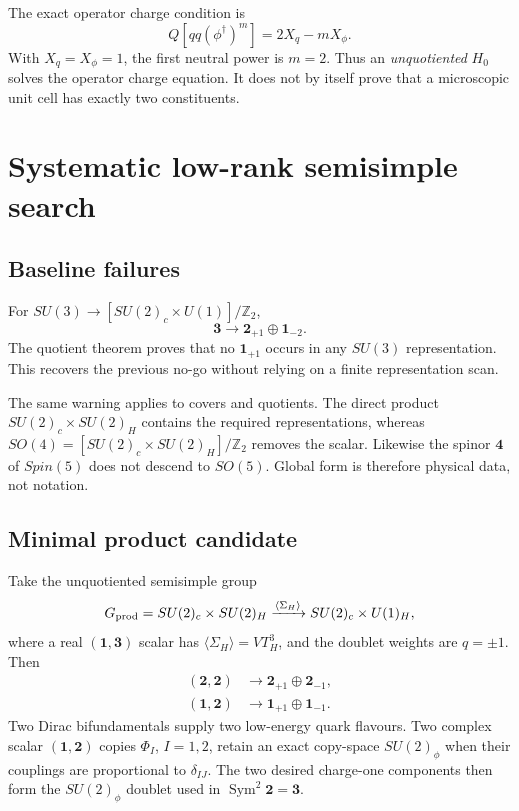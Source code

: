 \documentclass[11pt]{article}
\theoremstyle{definition}
\theoremstyle{remark}
\newcommand{\ZZ}{\mathbb Z}
\begin{document}
The exact operator charge condition is
\begin{equation}
 Q\!\left[qq(\phi^\dagger)^m\right]
 =2X_q-mX_\phi.
 \label{eq:dressing-charge}
\end{equation}
With \(X_q=X_\phi=1\), the first neutral power is \(m=2\).  Thus an
\emph{unquotiented} \(H_0\) solves the operator charge equation.  It does not
by itself prove that a microscopic unit cell has exactly two constituents.

\section{Systematic low-rank semisimple search}

\subsection{Baseline failures}

For
\(SU(3)\to[SU(2)_c\times U(1)]/\ZZ_2\),
\begin{equation}
 \bm3\to\bm2_{+1}\oplus\bm1_{-2}.
 \label{eq:su3-branch}
\end{equation}
The quotient theorem proves that no \(\bm1_{+1}\) occurs in any
\(SU(3)\) representation.  This recovers the previous no-go without relying
on a finite representation scan.

The same warning applies to covers and quotients.  The direct product
\(SU(2)_c\times SU(2)_H\) contains the required representations, whereas
\(SO(4)=[SU(2)_c\times SU(2)_H]/\ZZ_2\) removes the scalar.  Likewise the
spinor \(\bm4\) of \(Spin(5)\) does not descend to \(SO(5)\).  Global form is
therefore physical data, not notation.

\subsection{Minimal product candidate}

Take the unquotiented semisimple group
\begin{equation}
 G_{\rm prod}=SU(2)_c\times SU(2)_H
 \xrightarrow{\langle\Sigma_H\rangle}
 SU(2)_c\times U(1)_H,
 \label{eq:product-breaking}
\end{equation}
where a real \((\bm1,\bm3)\) scalar has
\(\langle\Sigma_H\rangle=V T_H^3\), and the doublet weights are
\(q=\pm1\).  Then
\begin{align}
 (\bm2,\bm2)&\to\bm2_{+1}\oplus\bm2_{-1},
 \label{eq:product-fermion}\\
 (\bm1,\bm2)&\to\bm1_{+1}\oplus\bm1_{-1}.
 \label{eq:product-scalar}
\end{align}
Two Dirac bifundamentals supply two low-energy quark flavours.  Two complex
scalar \((\bm1,\bm2)\) copies \(\Phi_I\), \(I=1,2\), retain an exact
copy-space \(SU(2)_\phi\) when their couplings are proportional to
\(\delta_{IJ}\).  The two desired charge-one components then form the
\(SU(2)_\phi\) doublet used in
\(\operatorname{Sym}^2\bm2=\bm3\).
\end{document}
